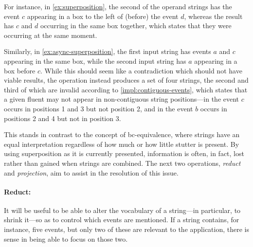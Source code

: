 \documentclass[a4paper,12pt,leqno]{article}
\newcommand{\bc}{{\rm b\!c}}
\newcommand{\vph}[1]{\vphantom{#1}}
\newcommand{\ebox}[1]{\fbox{$\vph{'(),}#1$}}
\newcommand{\EventString}[1]{%
	\renewcommand*{\do}[1]{\ebox{##1}}%
	\PipeParser{#1}%
}
\begin{document}
For instance, in \cref{ex:superposition}, the second of the operand strings has the event $c$ appearing in a box to the left of (before) the event $d$, whereas the result has $c$ and $d$ occurring in the same box together, which states that they were occurring at the same moment.

Similarly, in \cref{ex:async-superposition}, the first input string has events $a$ and $c$ appearing in the same box, while the second input string has $a$ appearing in a box before $c$. While this should seem like a contradiction which should not have viable results, the operation instead produces a set of four strings, the second and third of which are invalid according to \cref{impl:contiguous-events}, which states that a given fluent may not appear in non-contiguous string positions---in \EventString{a,c|a,b,d|b,c,d} the event $c$ occurs in positions 1 and 3 but not position 2, and in \EventString{a,c|a,b,c|a,c,d|b,c,d} the event $b$ occurs in positions 2 and 4 but not in position 3.

This stands in contrast to the concept of \bc-equivalence, where strings have an equal interpretation regardless of how much or how little stutter is present. By using superposition as it is currently presented, information is often, in fact, lost rather than gained when strings are combined. The next two operations, \textit{reduct} and \textit{projection}, aim to assist in the resolution of this issue.

\paragraph{Reduct:}\label{para:str-op-reduct}
It will be useful to be able to alter the vocabulary of a string---in particular, to shrink it---so as to control which events are mentioned. If a string contains, for instance, five events, but only two of these are relevant to the application, there is sense in being able to focus on those two.
\end{document}
